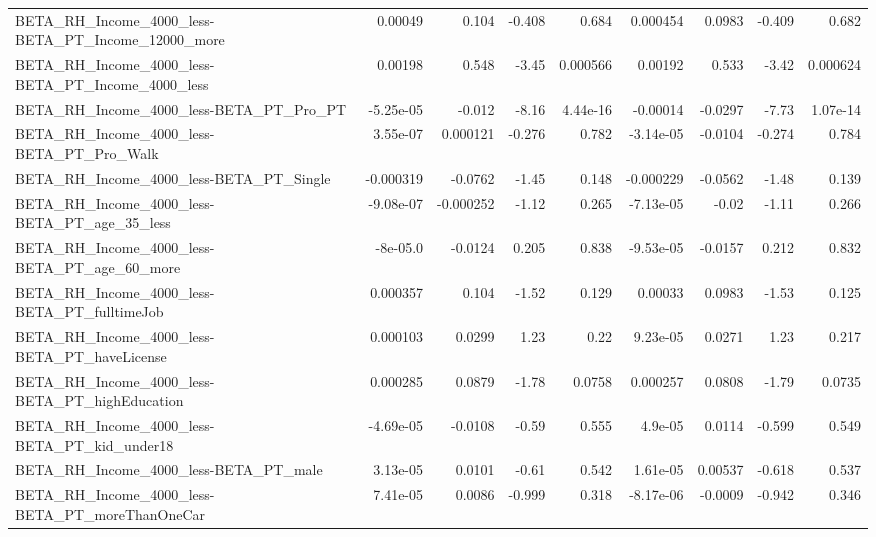 \begin{tabular}{lrrrrrrrr}
BETA\_RH\_Income\_4000\_less-BETA\_PT\_Income\_12000\_more &     0.00049 &        0.104 &    -0.408 &    0.684 &   0.000454 &      0.0983 &       -0.409 &         0.682 \\
BETA\_RH\_Income\_4000\_less-BETA\_PT\_Income\_4000\_less  &     0.00198 &        0.548 &     -3.45 & 0.000566 &    0.00192 &       0.533 &        -3.42 &      0.000624 \\
BETA\_RH\_Income\_4000\_less-BETA\_PT\_Pro\_PT            &   -5.25e-05 &       -0.012 &     -8.16 & 4.44e-16 &   -0.00014 &     -0.0297 &        -7.73 &      1.07e-14 \\
BETA\_RH\_Income\_4000\_less-BETA\_PT\_Pro\_Walk          &    3.55e-07 &     0.000121 &    -0.276 &    0.782 &  -3.14e-05 &     -0.0104 &       -0.274 &         0.784 \\
BETA\_RH\_Income\_4000\_less-BETA\_PT\_Single            &   -0.000319 &      -0.0762 &     -1.45 &    0.148 &  -0.000229 &     -0.0562 &        -1.48 &         0.139 \\
BETA\_RH\_Income\_4000\_less-BETA\_PT\_age\_35\_less       &   -9.08e-07 &    -0.000252 &     -1.12 &    0.265 &  -7.13e-05 &       -0.02 &        -1.11 &         0.266 \\
BETA\_RH\_Income\_4000\_less-BETA\_PT\_age\_60\_more       &    -8e-05.0 &      -0.0124 &     0.205 &    0.838 &  -9.53e-05 &     -0.0157 &        0.212 &         0.832 \\
BETA\_RH\_Income\_4000\_less-BETA\_PT\_fulltimeJob       &    0.000357 &        0.104 &     -1.52 &    0.129 &    0.00033 &      0.0983 &        -1.53 &         0.125 \\
BETA\_RH\_Income\_4000\_less-BETA\_PT\_haveLicense       &    0.000103 &       0.0299 &      1.23 &     0.22 &   9.23e-05 &      0.0271 &         1.23 &         0.217 \\
BETA\_RH\_Income\_4000\_less-BETA\_PT\_highEducation     &    0.000285 &       0.0879 &     -1.78 &   0.0758 &   0.000257 &      0.0808 &        -1.79 &        0.0735 \\
BETA\_RH\_Income\_4000\_less-BETA\_PT\_kid\_under18       &   -4.69e-05 &      -0.0108 &     -0.59 &    0.555 &    4.9e-05 &      0.0114 &       -0.599 &         0.549 \\
BETA\_RH\_Income\_4000\_less-BETA\_PT\_male              &    3.13e-05 &       0.0101 &     -0.61 &    0.542 &   1.61e-05 &     0.00537 &       -0.618 &         0.537 \\
BETA\_RH\_Income\_4000\_less-BETA\_PT\_moreThanOneCar    &    7.41e-05 &       0.0086 &    -0.999 &    0.318 &  -8.17e-06 &     -0.0009 &       -0.942 &         0.346 \\

\end{tabular}
